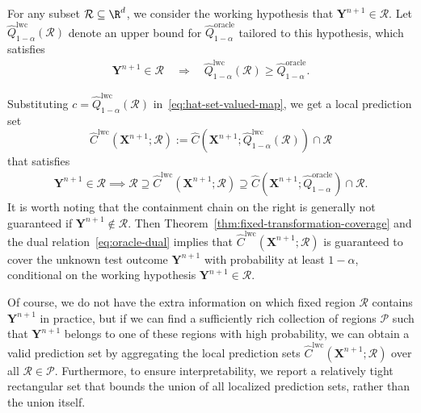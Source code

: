 For any subset $\mathcal{R} \subseteq \R^d$, we consider the working hypothesis that $\mathbf{Y}^{n+1} \in \mathcal{R}$.
Let $\hat{Q}^\mathrm{lwc}_{1-\alpha}(\mathcal{R})$ denote an upper bound for $\hat{Q}^{\mathrm{oracle}}_{1-\alpha}$ tailored to this hypothesis, which satisfies
\begin{align}\label{eq:lwc-upperbound}
  \mathbf{Y}^{n+1} \in \mathcal{R} \quad \Longrightarrow \quad \hat{Q}^\mathrm{lwc}_{1-\alpha}(\mathcal{R}) \geq \hat{Q}^{\mathrm{oracle}}_{1-\alpha}.
\end{align}
{\color{blue}
Substituting $c = \hat{Q}^\mathrm{lwc}_{1-\alpha}(\mathcal{R})$ in~\eqref{eq:hat-set-valued-map}, we get a local prediction set 
\begin{equation}\label{eq:lwc-prediction}
    \hat{C}^\mathrm{lwc} (\mathbf{X}^{n+1}; \mathcal{R}):=\hat{C}(\mathbf{X}^{n+1}; \hat{Q}^\mathrm{lwc}_{1-\alpha}(\mathcal{R})) \cap \mathcal{R}
\end{equation}
that satisfies
\begin{align} \label{eq:lwc-local-containment}
  \mathbf{Y}^{n+1} \in \mathcal{R} \implies \mathcal{R} \supseteq \hat{C}^\mathrm{lwc} (\mathbf{X}^{n+1}; \mathcal{R}) \supseteq \hat{C}(\mathbf{X}^{n+1}; \hat{Q}^{\mathrm{oracle}}_{1-\alpha}) \cap \mathcal{R}.
\end{align}
It is worth noting that the containment chain on the right is generally not guaranteed if $\mathbf{Y}^{n+1} \notin \mathcal{R}$. Then Theorem~\ref{thm:fixed-transformation-coverage} and the dual relation~\eqref{eq:oracle-dual} implies that $\hat{C}^\mathrm{lwc} (\mathbf{X}^{n+1}; \mathcal{R})$
is guaranteed to cover the unknown test outcome $\mathbf{Y}^{n+1}$ with probability at least $1-\alpha$, conditional on the working hypothesis $\mathbf{Y}^{n+1} \in \mathcal{R}$. 

Of course, we do not have the extra information on which fixed region $\mathcal{R}$ contains $\mathbf{Y}^{n+1}$ in practice, but if we can find a sufficiently rich collection of regions $\mathcal{P}$ such that $\mathbf{Y}^{n+1}$ belongs to one of these regions with high probability, we can obtain a valid prediction set by aggregating the local prediction sets $\hat{C}^\mathrm{lwc}(\mathbf{X}^{n+1}; \mathcal{R})$ over all $\mathcal{R} \in \mathcal{P}$. Furthermore, to ensure interpretability, we report a relatively tight rectangular set that bounds the union of all localized prediction sets, rather than the union itself.

}
